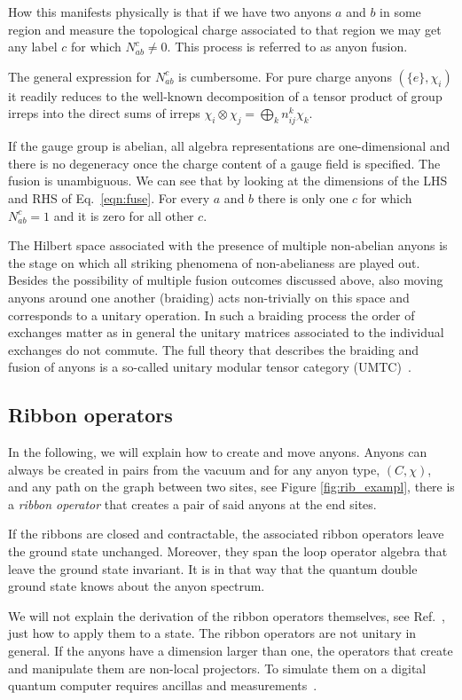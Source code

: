\documentclass[a4paper,twocolumn,11pt]{quantumarticle}
\begin{document}
How this manifests physically is that if we have two anyons $a$ and $b$ in some region and measure the topological charge associated to that region we may get any label $c$ for which $N_{ab}^c \neq 0$. This process is referred to as anyon fusion.

The general expression for $N_{ab}^c$ is cumbersome. For pure charge anyons $(\{e\}, \chi_i)$ it readily reduces to the well-known  decomposition of a tensor product of group irreps into the direct sums of irreps $\chi_i\otimes\chi_j = \bigoplus_k n^k_{ij} \chi_k$.

If the gauge group is abelian, all algebra representations are one-dimensional and there is no degeneracy once the charge content of a gauge field is specified. The fusion is unambiguous. 
We can see that by looking at the dimensions of the LHS and RHS of Eq.~\eqref{eqn:fuse}. For every $a$ and $b$ there is only one $c$ for which $N_{ab}^c=1$ and it is zero for all other $c$.

The Hilbert space associated with the presence of multiple non-abelian anyons is the stage on which all striking phenomena of non-abelianess are played out. Besides the possibility of multiple fusion outcomes discussed above,  also moving anyons around one another (braiding) acts non-trivially on this space and corresponds to a unitary operation. In such a braiding process the order of exchanges matter as in general the unitary matrices associated to the individual exchanges do not commute. The full theory that describes the braiding and fusion of anyons is a so-called unitary modular tensor category (UMTC)~\cite{Kitaev_2003}.
\subsection{Ribbon operators}\label{sec:ribbon_ops}

In the following, we will explain how to create and move anyons. Anyons can always be created in pairs from the vacuum and for any anyon type, $(C, \chi)$, and any path on the graph between two sites, see Figure \ref{fig:rib_exampl}, there is a \emph{ribbon operator} that creates a pair of said anyons at the end sites. 


If the ribbons are closed and contractable, the associated ribbon operators leave the ground state unchanged. Moreover, they span the loop operator algebra that leave the ground state invariant. It is in that way that the quantum double ground state knows about the anyon spectrum.

We will not explain the derivation of the ribbon operators themselves, see Ref.~\cite{Kitaev_2003,cui2018topological}, just how to apply them to a state.
The ribbon operators are not unitary in general. If the anyons have a dimension larger than one, the operators that create and manipulate them are non-local projectors. To simulate them on a digital quantum computer requires ancillas and measurements~\cite{Cirac}. 
\end{document}

